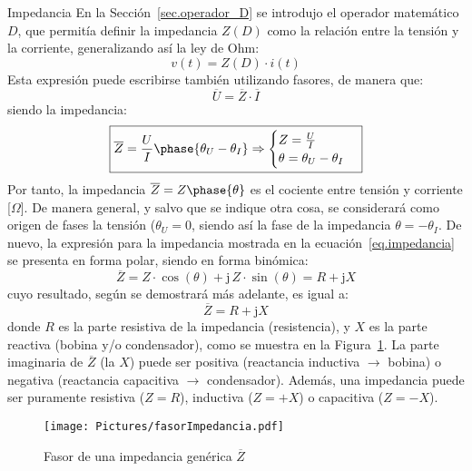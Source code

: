\documentclass[11pt]{book} %
\makeatletter
\numberwithin{dummy}{section}
\theoremstyle{ocrenumbox}
\theoremstyle{blacknumex}
\theoremstyle{blacknumbox}
\theoremstyle{ocrenum}
\renewcommand{\subsection}{\@startsection {subsection}{2}{\z@}
{-3ex \@plus -0.1ex \@minus -.4ex}
{0.5ex \@plus.2ex }
{\normalfont\sffamily\bfseries}}
\makeatother
\begin{document}
	\subsection{Impedancia}
	En la Sección~\ref{sec.operador_D} se introdujo el operador matemático $D$, que permitía definir la impedancia $Z(D)$ como la relación entre la tensión y la corriente, generalizando así la ley de Ohm:
	\begin{equation*}
		v(t)=Z(D)\cdot i(t)
	\end{equation*}
	Esta expresión puede escribirse también utilizando fasores, de manera que: 
	\begin{equation}\label{eq.ohm_generalizada}
		\boxed{ \overline{U}=\overline{Z}\cdot\overline{I} }
	\end{equation}
	siendo la impedancia:
	\begin{equation}\label{eq.impedancia}
		\boxed{\overline{Z} = \frac{U}{I}\phase{\theta_U - \theta_I} \Rightarrow 
			\begin{cases}
				Z = \frac{U}{I}\\
				\theta = \theta_U - \theta_I
		\end{cases}}
	\end{equation}
	Por tanto, la impedancia $\overline{Z}=Z\phase{\theta}$ es el cociente entre tensión y corriente [$\Omega$]. De manera general, y salvo que se indique otra cosa, se considerará como origen de fases la tensión ($\theta_U=0$, siendo así la fase de la impedancia $\theta=-\theta_I$. De nuevo, la expresión para la impedancia mostrada en la ecuación~\eqref{eq.impedancia} se presenta en forma polar, siendo en forma binómica: 
	\begin{equation*}
		\overline{Z} = Z\cdot\cos(\theta)+\mathrm{j}\,Z\cdot\sin(\theta) = R + \mathrm{j} X
	\end{equation*}
	cuyo resultado, según se demostrará más adelante, es igual a: 
	\begin{equation}
		\boxed{\overline{Z} =  R + \mathrm{j} X}
	\end{equation}
	donde $R$ es la parte resistiva de la impedancia (resistencia), y $X$ es la parte reactiva (bobina y/o condensador), como se muestra en la Figura~\ref{fig.fasorimpedancia}. La parte imaginaria de $\overline{Z}$ (la $X$) puede ser positiva (reactancia inductiva $\rightarrow$ bobina) o negativa (reactancia capacitiva $\rightarrow$ condensador). Además, una impedancia puede ser puramente resistiva ($Z=R$), inductiva ($Z=+X$) o capacitiva ($Z=-X$).
	\begin{figure}[htbp]
		\centering
		\texttt{[image: Pictures/fasorImpedancia.pdf]}
		\caption{Fasor de una impedancia genérica $\overline{Z}$}
		\label{fig.fasorimpedancia}
	\end{figure}
	
\end{document}
